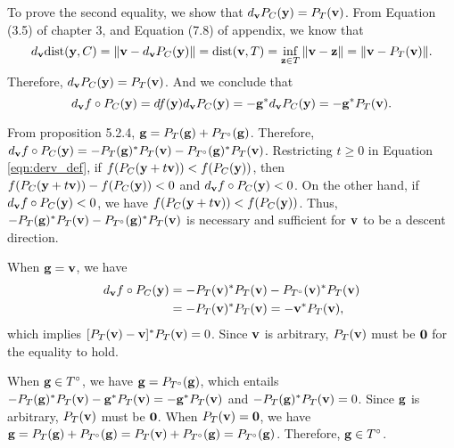 \documentclass{scrartcl}
\begin{document}
To prove the second equality, we show that $d_{\mathbf{v}}{P_C}(\mathbf{y}) = P_T(\mathbf{v})$. From Equation (3.5) of chapter 3, and Equation (7.8) of appendix, we know that
\begin{equation}
d_{\mathbf{v}} \text{dist}(\mathbf{y}, C) = \|\mathbf{v}-d_{\mathbf{v}}P_C(\mathbf{y})\| = \text{dist}(\mathbf{v}, T) = \inf_{\mathbf{z} \in T} \|\mathbf{v} - \mathbf{z}\| = \|\mathbf{v} - P_T(\mathbf{v})\|.
\end{equation}
Therefore, $d_{\mathbf{v}}{P_C}(\mathbf{y}) = P_T(\mathbf{v})$. And we conclude that
\begin{equation}
d_{\mathbf{v}} f \circ P_C(\mathbf{y}) = df (\mathbf{y}) d_{\mathbf{v}}{P_C}(\mathbf{y}) = -\mathbf{g}^*d_{\mathbf{v}}{P_C}(\mathbf{y}) = -\mathbf{g}^*P_T(\mathbf{v}).
\end{equation}

From proposition 5.2.4, $\mathbf{g} = P_T(\mathbf{g}) + P_{T^{\circ}}(\mathbf{g})$. Therefore,
$d_{\mathbf{v}} f \circ P_C(\mathbf{y}) = -P_T(\mathbf{g})^*P_T(\mathbf{v}) - P_{T^{\circ}}(\mathbf{g})^*P_T(\mathbf{v})$. Restricting $t \ge 0$ in Equation \eqref{eqn:derv_def},
if $f(P_C(\mathbf{y}+t\mathbf{v})) < f(P_C(\mathbf{y}))$, then $f(P_C(\mathbf{y}+t\mathbf{v})) - f(P_C(\mathbf{y})) < 0$ and $d_{\mathbf{v}} f \circ P_C(\mathbf{y}) < 0$.
On the other hand, if $d_{\mathbf{v}} f \circ P_C(\mathbf{y}) < 0$, we have $f(P_C(\mathbf{y}+t\mathbf{v})) < f(P_C(\mathbf{y}))$. Thus,
$-P_T(\mathbf{g})^*P_T(\mathbf{v}) - P_{T^{\circ}}(\mathbf{g})^*P_T(\mathbf{v})$ is necessary and sufficient for $\mathbf{v}$ to be a descent direction.

When $\mathbf{g} = \mathbf{v}$, we have
\begin{equation}
\begin{split}
d_{\mathbf{v}} f \circ P_C(\mathbf{y}) & = -P_T(\mathbf{v})^*P_T(\mathbf{v}) - P_{T^{\circ}}(\mathbf{v})^*P_T(\mathbf{v}) \\
                               & = -P_T(\mathbf{v})^*P_T(\mathbf{v}) = -\mathbf{v}^*P_T(\mathbf{v}),
\end{split}
\end{equation}
which implies $[P_T(\mathbf{v})-\mathbf{v}]^*P_T(\mathbf{v}) = 0$. Since $\mathbf{v}$ is arbitrary, $P_T(\mathbf{v})$ must be $\mathbf{0}$ for the equality to hold.

When $\mathbf{g} \in T^{\circ}$, we have $\mathbf{g} = P_{T^\circ}(\mathbf{g})$, which entails $-P_T(\mathbf{g})^*P_T(\mathbf{v}) - \mathbf{g}^*P_T(\mathbf{v}) = -\mathbf{g}^*P_T(\mathbf{v})$
and $-P_T(\mathbf{g})^*P_T(\mathbf{v}) = 0$. Since $\mathbf{g}$ is arbitrary, $P_T(\mathbf{v})$ must be $\mathbf{0}$. When $P_T(\mathbf{v}) = \mathbf{0}$, we have
$\mathbf{g} = P_T(\mathbf{g}) + P_{T^{\circ}}(\mathbf{g}) = P_T(\mathbf{v}) + P_{T^{\circ}}(\mathbf{g}) = P_{T^{\circ}}(\mathbf{g})$. Therefore, $\mathbf{g} \in T^{\circ}$.

\end{document}
